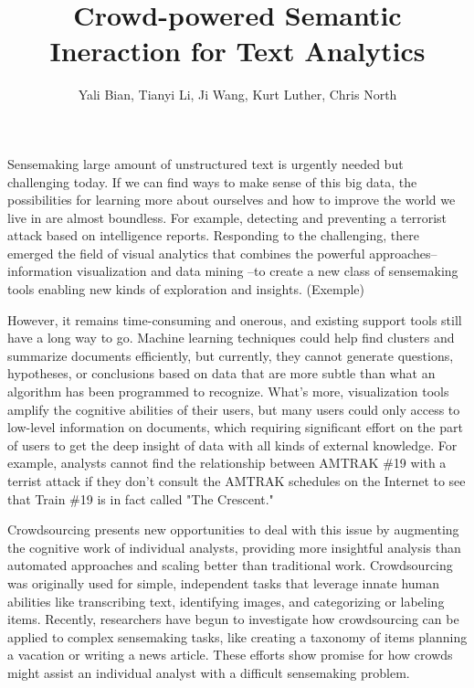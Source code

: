 \documentclass[journal]{vgtc}                %
\title{Crowd-powered Semantic Ineraction for Text Analytics}
\author{Yali Bian, Tianyi Li, Ji Wang, Kurt Luther, Chris North}
\begin{document}
\maketitle
Sensemaking large amount of unstructured text is urgently needed but challenging today. If we can find ways to make sense of this big data, the possibilities for learning more about ourselves and how to improve the world we live in are almost boundless. For example, detecting and preventing a terrorist attack based on intelligence reports. Responding to the challenging, there emerged the field of visual analytics\cite{Thomas2005} that combines the powerful approaches--information visualization\cite{card1999readings} and data mining\cite{berry1997data} --to create a new class of sensemaking tools\cite{Pirolli2005} enabling new kinds of exploration and insights. (Exemple)

However, it remains time-consuming and onerous, and existing support tools still have a long way to go. Machine learning techniques could help find clusters and summarize documents efficiently, but currently, they cannot generate questions, hypotheses, or conclusions based on data that are more subtle than what an algorithm has been programmed to recognize. What's more, visualization tools amplify the cognitive abilities of their users, but many users could only access to low-level information on documents, which requiring significant effort on the part of users to get the deep insight of data with all kinds of external knowledge. For example, analysts cannot find the relationship between AMTRAK \#19 with a terrist attack if they don't consult the AMTRAK schedules on the Internet to see that Train \#19 is in fact called "The Crescent."


Crowdsourcing presents new opportunities to deal with this issue by augmenting the cognitive work of individual analysts, providing more insightful analysis than automated approaches and scaling better than traditional work. Crowdsourcing was originally used for simple, independent tasks that leverage innate human abilities like transcribing text\cite{causer2012transcription}, identifying images\cite{gupta2013faking}, and categorizing or labeling items\cite{bragg2013crowdsourcing}. Recently, researchers have begun to investigate how crowdsourcing can be applied to complex sensemaking tasks, like creating a taxonomy of items\cite{Chilton2013} planning a vacation\cite{Zhang2012} or writing a news article\cite{kittur2011crowdforge}. These efforts show promise for how crowds might assist an individual analyst with a difficult sensemaking problem.
\end{document}

